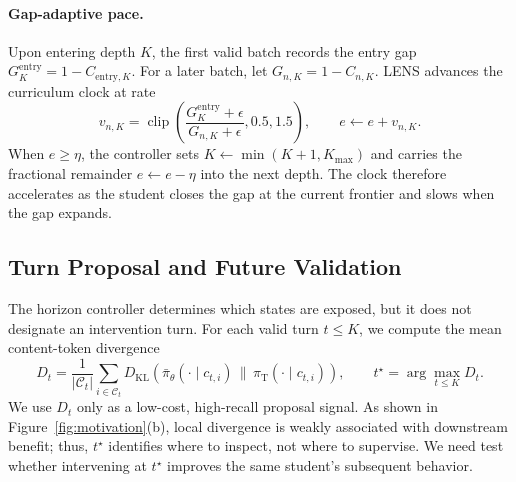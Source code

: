 \documentclass{article}
\begin{document}
\paragraph{Gap-adaptive pace.}
Upon entering depth $K$, the first valid batch records the entry gap
$G_K^{\mathrm{entry}}=1-C_{\mathrm{entry},K}$.  For a later batch, let
$G_{n,K}=1-C_{n,K}$.  LENS advances the curriculum clock at rate
\begin{equation}
    v_{n,K}
    =\operatorname{clip}\!\left(
      \frac{G_K^{\mathrm{entry}}+\epsilon}
           {G_{n,K}+\epsilon},
      0.5,1.5
      \right),
    \qquad
    e\leftarrow e+v_{n,K}.
    \label{eq:gap-adaptive-pace}
\end{equation}
When $e\geq\eta$, the controller sets
$K\leftarrow\min(K+1,K_{\max})$ and carries the fractional remainder
$e\leftarrow e-\eta$ into the next depth.  The clock therefore accelerates as the student closes the
gap at the current frontier and slows when the gap expands.

\subsection{Turn Proposal and Future Validation}

The horizon controller determines which states are exposed, but it does not designate an
intervention turn.  For each valid turn $t\leq K$, we compute the mean content-token divergence
\begin{equation}
    D_t
    =\frac{1}{|\mathcal C_t|}
      \sum_{i\in\mathcal C_t}
      D_{\mathrm{KL}}\!\left(
        \bar\pi_\theta(\cdot\mid c_{t,i})
        \,\|\,
        \pi_{\mathrm T}(\cdot\mid c_{t,i})
      \right),
    \qquad
    t^\star=\arg\max_{t\leq K}D_t.
    \label{eq:top-kl-proposal}
\end{equation}
We use $D_t$ only as a low-cost, high-recall proposal signal.  As shown in
Figure~\ref{fig:motivation}(b), local divergence is weakly associated with downstream benefit;
thus, $t^\star$ identifies where to inspect, not where to supervise.  We need test whether
intervening at $t^\star$ improves the same student's subsequent behavior.
\end{document}
